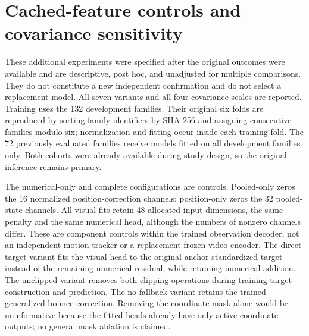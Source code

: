 \section{Cached-feature controls and covariance sensitivity}\label{sec:support}
These additional experiments were specified after the original outcomes were available and are descriptive, post hoc, and unadjusted for multiple comparisons. They do not constitute a new independent confirmation and do not select a replacement model. All seven variants and all four covariance scales are reported. Training uses the 132 development families. Their original six folds are reproduced by sorting family identifiers by SHA-256 and assigning consecutive families modulo six; normalization and fitting occur inside each training fold. The 72 previously evaluated families receive models fitted on all development families only. Both cohorts were already available during study design, so the original inference remains primary.

The numerical-only and complete configurations are controls. Pooled-only zeros the 16 normalized position-correction channels; position-only zeros the 32 pooled-state channels. All visual fits retain 48 allocated input dimensions, the same penalty and the same numerical head, although the numbers of nonzero channels differ. These are component controls within the trained observation decoder, not an independent motion tracker or a replacement frozen video encoder. The direct-target variant fits the visual head to the original anchor-standardized target instead of the remaining numerical residual, while retaining numerical addition. The unclipped variant removes both clipping operations during training-target construction and prediction. The no-fallback variant retains the trained generalized-bounce correction. Removing the coordinate mask alone would be uninformative because the fitted heads already have only active-coordinate outputs; no general mask ablation is claimed.

